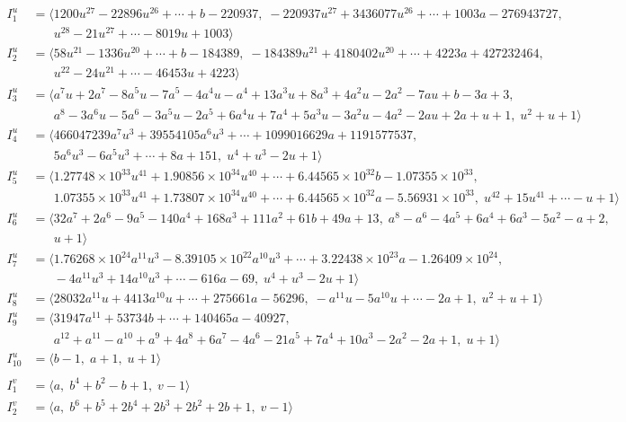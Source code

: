 \documentclass[1p]{elsarticle_modified}
\theoremstyle{definition}
\begin{document}
\begin{align*}
I^u_{1}&=\langle 
1200 u^{27}-22896 u^{26}+\cdots+b-220937,\;-220937 u^{27}+3436077 u^{26}+\cdots+1003 a-276943727,\\
\phantom{I^u_{1}}&\phantom{= \langle  }u^{28}-21 u^{27}+\cdots-8019 u+1003\rangle \\
I^u_{2}&=\langle 
58 u^{21}-1336 u^{20}+\cdots+b-184389,\;-184389 u^{21}+4180402 u^{20}+\cdots+4223 a+427232464,\\
\phantom{I^u_{2}}&\phantom{= \langle  }u^{22}-24 u^{21}+\cdots-46453 u+4223\rangle \\
I^u_{3}&=\langle 
a^7 u+2 a^7-8 a^5 u-7 a^5-4 a^4 u- a^4+13 a^3 u+8 a^3+4 a^2 u-2 a^2-7 a u+b-3 a+3,\\
\phantom{I^u_{3}}&\phantom{= \langle  }a^8-3 a^6 u-5 a^6-3 a^5 u-2 a^5+6 a^4 u+7 a^4+5 a^3 u-3 a^2 u-4 a^2-2 a u+2 a+u+1,\;u^2+u+1\rangle \\
I^u_{4}&=\langle 
466047239 a^7 u^3+39554105 a^6 u^3+\cdots+1099016629 a+1191577537,\\
\phantom{I^u_{4}}&\phantom{= \langle  }5 a^6 u^3-6 a^5 u^3+\cdots+8 a+151,\;u^4+u^3-2 u+1\rangle \\
I^u_{5}&=\langle 
1.27748\times10^{33} u^{41}+1.90856\times10^{34} u^{40}+\cdots+6.44565\times10^{32} b-1.07355\times10^{33},\\
\phantom{I^u_{5}}&\phantom{= \langle  }1.07355\times10^{33} u^{41}+1.73807\times10^{34} u^{40}+\cdots+6.44565\times10^{32} a-5.56931\times10^{33},\;u^{42}+15 u^{41}+\cdots- u+1\rangle \\
I^u_{6}&=\langle 
32 a^7+2 a^6-9 a^5-140 a^4+168 a^3+111 a^2+61 b+49 a+13,\;a^8- a^6-4 a^5+6 a^4+6 a^3-5 a^2- a+2,\\
\phantom{I^u_{6}}&\phantom{= \langle  }u+1\rangle \\
I^u_{7}&=\langle 
1.76268\times10^{24} a^{11} u^{3}-8.39105\times10^{22} a^{10} u^{3}+\cdots+3.22438\times10^{23} a-1.26409\times10^{24},\\
\phantom{I^u_{7}}&\phantom{= \langle  }-4 a^{11} u^3+14 a^{10} u^3+\cdots-616 a-69,\;u^4+u^3-2 u+1\rangle \\
I^u_{8}&=\langle 
28032 a^{11} u+4413 a^{10} u+\cdots+275661 a-56296,\;- a^{11} u-5 a^{10} u+\cdots-2 a+1,\;u^2+u+1\rangle \\
I^u_{9}&=\langle 
31947 a^{11}+53734 b+\cdots+140465 a-40927,\\
\phantom{I^u_{9}}&\phantom{= \langle  }a^{12}+a^{11}- a^{10}+a^9+4 a^8+6 a^7-4 a^6-21 a^5+7 a^4+10 a^3-2 a^2-2 a+1,\;u+1\rangle \\
I^u_{10}&=\langle 
b-1,\;a+1,\;u+1\rangle \\
\\
I^v_{1}&=\langle 
a,\;b^4+b^2- b+1,\;v-1\rangle \\
I^v_{2}&=\langle 
a,\;b^6+b^5+2 b^4+2 b^3+2 b^2+2 b+1,\;v-1\rangle \\
\end{align*}
\end{document}
